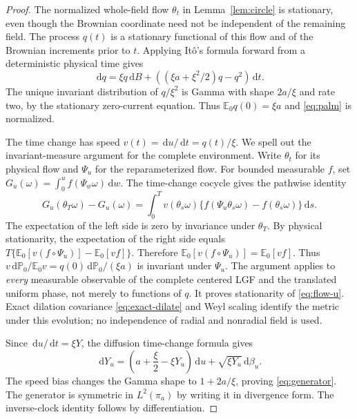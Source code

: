 \documentclass[11pt,reqno]{amsart}
\theoremstyle{plain}
\theoremstyle{definition}
\theoremstyle{remark}
\newcommand{\E}{\mathbb E}
\newcommand{\Pp}{\mathbb P}
\newcommand{\1}{\mathbf{1}}
\newcommand{\dd}{\,\mathrm d}
\begin{document}
\begin{proof}
The normalized whole-field flow $\theta_t$ in Lemma~\ref{lem:circle} is stationary, even though the Brownian coordinate need not be independent of the remaining field. The process $q(t)$ is a stationary functional of this flow and of the Brownian increments prior to $t$. Applying It\^o's formula forward from a deterministic physical time gives
\[
\dd q=\xi q\dd B+\left((\xi a+\xi^2/2)q-q^2\right)\dd t.
\]
The unique invariant distribution of $q/\xi^2$ is Gamma with shape $2a/\xi$ and rate two, by the stationary zero-current equation. Thus $\E_0q(0)=\xi a$ and \eqref{eq:palm} is normalized.

The time change has speed $v(t)=\dd u/\dd t=q(t)/\xi$. We spell out the invariant-measure argument for the complete environment. Write $\theta_t$ for its physical flow and $\Psi_u$ for the reparameterized flow. For bounded measurable $f$, set $G_u(\omega)=\int_0^u f(\Psi_w\omega)\dd w$. The time-change cocycle gives the pathwise identity
\[
G_u(\theta_T\omega)-G_u(\omega)
=\int_0^T v(\theta_s\omega)
\{f(\Psi_u\theta_s\omega)-f(\theta_s\omega)\}\dd s.
\]
The expectation of the left side is zero by invariance under $\theta_T$. By physical stationarity, the expectation of the right side equals $T\{\E_0[v(f\circ\Psi_u)]-\E_0[vf]\}$. Therefore
$\E_0[v(f\circ\Psi_u)] =\E_0[vf]$.
Thus $v\dd\Pp_0/\E_0v=q(0)\dd\Pp_0/(\xi a)$ is invariant under $\Psi_u$. The argument applies to \emph{every} measurable observable of the complete centered LGF and the translated uniform phase, not merely to functions of $q$. It proves stationarity of \eqref{eq:flow-u}. Exact dilation covariance \eqref{eq:exact-dilate} and Weyl scaling identify the metric under this evolution; no independence of radial and nonradial field is used.

Since $\dd u/\dd t=\xi Y$, the diffusion time-change formula gives
\[
\dd Y_u=\left(a+\frac\xi2-\xi Y_u\right)\dd u+\sqrt{\xi Y_u}\dd\beta_u.
\]
The speed bias changes the Gamma shape to $1+2a/\xi$, proving \eqref{eq:generator}. The generator is symmetric in $L^2(\pi_a)$ by writing it in divergence form. The inverse-clock identity follows by differentiation.
\end{proof}
\end{document}
